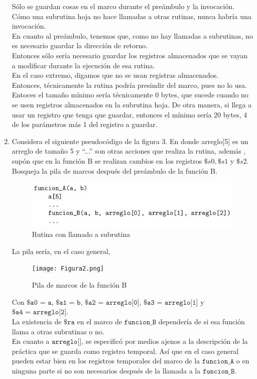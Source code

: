 \documentclass{article}
\begin{document}
\begin{enumerate}
{\begin{enumerate}
{			Sólo se guardan cosas en el marco durante el preámbulo y la 
			invocación.\\
			Cómo una subrutina hoja no hace llamadas a otras rutinas, nunca 
			habría una invocación.\\
			En cuanto al preámbulo, tenemos que, como no hay llamadas a
			subrutinas, no es necesario guardar la dirección de retorno.\\
			Entonces sólo sería necesario guardar los registros almacenados que 
			se vayan a modificar durante la ejecución de esa rutina.\\
			En el caso extremo, digamos que no se usan registras almacenados.\\
			Entonces, técnicamente la rutina podría presindir del marco, pues no
			lo usa. Entoces el tamaño mínimo sería técnicamente 0 bytes, que
			sucede cuando no se usen registros almacenados en la subrutina hoja.
			De otra manera, si llega a usar un registro que tenga que guardar,
			entonces el mínimo sería 20 bytes, 4 de los parámetros más 1 del
			registro a guardar.
			}
		\end{enumerate}
		
	
	}
	
		
	\item{
	Considera el siguiente pseudocódigo de la figura 3. En donde arreglo[5] es un
	arreglo de tamaño 5 y “...” son otras acciones que realiza la rutina, además
	, supón que en la función B se realizan cambios en los registros $\$s0,
	\$s1$ y $\$s2$. Bosqueja la pila de marcos después del preámbulo de la 
	función B.
	
	\begin{figure}[H]
		\centering
		\includegraphics[scale=0.5]{Figura1.png}
		\caption{Rutina con llamado a subrutina}
	\end{figure}

	La pila sería, en el caso general,
	
	\begin{figure}[H]
		\centering
		\texttt{[image: Figura2.png]}
		\caption{Pila de marcos de la función B}
	\end{figure}
	}
	Con $\texttt{\$a0 = a}$, $\texttt{\$a1 = b}$, $\texttt{\$a2 = arreglo[0]}$,
	$\texttt{\$a3 = arreglo[1]}$ y $\texttt{\$a4 = arreglo[2]}$.\\
	La existencia de $\texttt{\$ra}$ en el marco de $\texttt{funcion\_B}$
	dependería de si esa función llama a otras subrutinas o no.\\
	En cuanto a $\texttt{arreglo[]}$, se especificó por medios ajenos a la
	descripción de la práctica que se guarda como registro temporal. Así que en
	el caso general pueden estar bien en los registros temporales del marco de 
	la $\texttt{funcion\_A}$ o en ninguna parte si no son necesarios después de
	la llamada a la $\texttt{funcion\_B}$.
    \end{enumerate}
\end{document}
